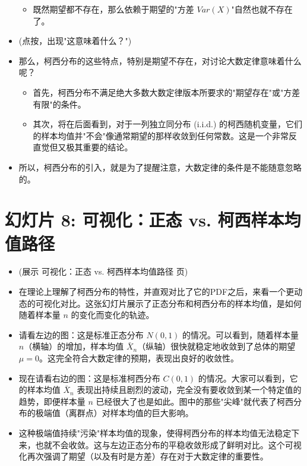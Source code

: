 \documentclass[UTF8]{article} %
\begin{document}
\begin{itemize}
\begin{itemize}[label=\textbullet, itemsep=0.3em]
        \item 既然期望都不存在，那么依赖于期望的"方差 $Var(X)$"自然也就不存在了。
    \end{itemize}
    \item (点按，出现"这意味着什么？")
    \item 那么，柯西分布的这些特点，特别是期望不存在，对讨论大数定律意味着什么呢？
    \begin{itemize}[label=\textbullet, itemsep=0.3em]
        \item 首先，柯西分布不满足绝大多数大数定律版本所要求的"期望存在"或"方差有限"的条件。
        \item 其次，将在后面看到，对于一列独立同分布 (i.i.d.) 的柯西随机变量，它们的样本均值并"不会"像通常期望的那样收敛到任何常数。这是一个非常反直觉但又极其重要的结论。
    \end{itemize}
    \item 所以，柯西分布的引入，就是为了提醒注意，大数定律的条件是不能随意忽略的。
\end{itemize}

\section*{幻灯片 8: 可视化：正态 vs. 柯西样本均值路径}
\begin{itemize}
    \itemsep1em
    \item (展示 可视化：正态 vs. 柯西样本均值路径 页)
    \item 在理论上理解了柯西分布的特性，并直观对比了它的PDF之后，来看一个更动态的可视化对比。这张幻灯片展示了正态分布和柯西分布的样本均值，是如何随着样本量 $n$ 的变化而变化的轨迹。
    \item 请看左边的图：这是标准正态分布 $N(0,1)$ 的情况。可以看到，随着样本量 $n$（横轴）的增加，样本均值 $\bar{X}_n$（纵轴）很快就稳定地收敛到了总体的期望 $\mu=0$。这完全符合大数定律的预期，表现出良好的收敛性。
    \item 现在请看右边的图：这是标准柯西分布 $C(0,1)$ 的情况。大家可以看到，它的样本均值 $\bar{X}_n$ 表现出持续且剧烈的波动，完全没有要收敛到某一个特定值的趋势，即便样本量 $n$ 已经很大了也是如此。图中的那些"尖峰"就代表了柯西分布的极端值（离群点）对样本均值的巨大影响。
    \item 这种极端值持续"污染"样本均值的现象，使得柯西分布的样本均值无法稳定下来，也就不会收敛。这与左边正态分布的平稳收敛形成了鲜明对比。这个可视化再次强调了期望（以及有时是方差）存在对于大数定律的重要性。
\end{itemize}
\end{document}
